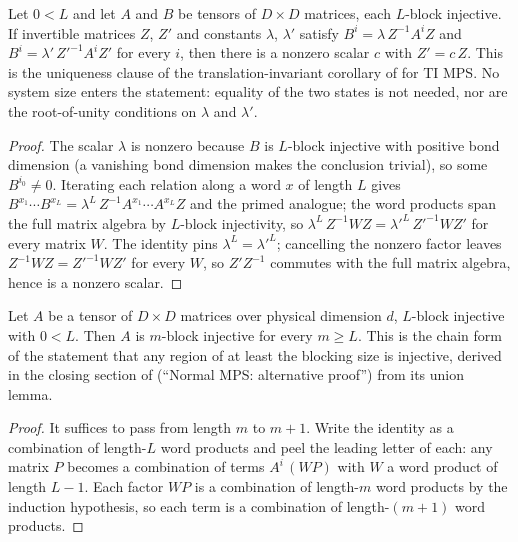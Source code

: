 \begin{corollary}%
    \label{cor:fundamentalTheorem_normalMPS_translationInvariant_gauge_unique}
    \leanok
    Let $0 < L$ and let $A$ and $B$ be tensors of $D \times D$ matrices,
    each $L$-block injective.  If invertible matrices $Z$, $Z'$ and
    constants $\lambda$, $\lambda'$ satisfy
    $B^i = \lambda\, Z^{-1} A^i Z$ and $B^i = \lambda'\, Z'^{-1} A^i Z'$ for
    every $i$, then there is a nonzero scalar $c$ with $Z' = c\,Z$.  This is
    the uniqueness clause of the translation-invariant corollary of
    \cite[Section~3]{Molnar2018NormalPEPS} for TI MPS.  No system size
    enters the statement: equality of the two states is not needed, nor are
    the root-of-unity conditions on $\lambda$ and $\lambda'$.
\end{corollary}
\begin{proof}\leanok
    The scalar $\lambda$ is nonzero because $B$ is $L$-block injective with
    positive bond dimension (a vanishing bond dimension makes the
    conclusion trivial), so some $B^{i_0} \neq 0$.  Iterating each relation
    along a word $x$ of length $L$ gives
    $B^{x_1} \cdots B^{x_L} = \lambda^L\, Z^{-1} A^{x_1} \cdots A^{x_L} Z$
    and the primed analogue; the word products span the full matrix algebra
    by $L$-block injectivity, so
    $\lambda^L\, Z^{-1} W Z = \lambda'^L\, Z'^{-1} W Z'$ for every matrix
    $W$.  The identity pins $\lambda^L = \lambda'^L$; cancelling the
    nonzero factor leaves $Z^{-1} W Z = Z'^{-1} W Z'$ for every $W$, so
    $Z' Z^{-1}$ commutes with the full matrix algebra, hence is a nonzero
    scalar.
\end{proof}

\begin{lemma}%
    \label{lem:isNBlkInjective_of_le}
    \leanok
    Let $A$ be a tensor of $D \times D$ matrices over physical dimension
    $d$, $L$-block injective with $0 < L$.  Then $A$ is $m$-block injective
    for every $m \ge L$.  This is the chain form of the statement that any
    region of at least the blocking size is injective, derived in the
    closing section of \cite{Molnar2018NormalPEPS} (``Normal MPS:
    alternative proof'') from its union lemma.
\end{lemma}
\begin{proof}\leanok
    It suffices to pass from length $m$ to $m + 1$.  Write the identity as
    a combination of length-$L$ word products and peel the leading letter
    of each: any matrix $P$ becomes a combination of terms
    $A^{i}\,(W P)$ with $W$ a word product of length $L - 1$.  Each factor
    $W P$ is a combination of length-$m$ word products by the induction
    hypothesis, so each term is a combination of length-$(m+1)$ word
    products.
\end{proof}

